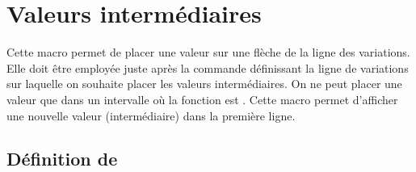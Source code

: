 \section{Valeurs intermédiaires }
Cette macro permet de placer une valeur sur une flèche de la ligne des variations. Elle doit être employée juste après la commande  définissant la ligne de variations sur laquelle on souhaite placer les valeurs intermédiaires. On ne peut placer une valeur que dans un intervalle où la fonction est . Cette macro permet d'afficher une nouvelle valeur (intermédiaire) dans la première ligne. 

\subsection{Définition de   }

